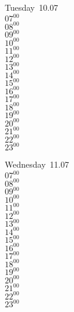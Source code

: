 \documentclass[11pt, a4paper]{book}\usepackage[]{graphicx}\usepackage[]{color}
\begin{document}
\begin{weekdaybox}
  Tuesday~10.07\\
  { 
  \vfill
  $07^{00}$\\
$08^{00}$\\
$09^{00}$\\
$10^{00}$\\
$11^{00}$\\
$12^{00}$\\
$13^{00}$\\
$14^{00}$\\
$15^{00}$\\
$16^{00}$\\
$17^{00}$\\
$18^{00}$\\
$19^{00}$\\
$20^{00}$\\
$21^{00}$\\
$22^{00}$\\
$23^{00}$\\
  }
\end{weekdaybox}
\begin{weekdaybox}
  Wednesday~11.07\\
  { 
  \vfill
  $07^{00}$\\
$08^{00}$\\
$09^{00}$\\
$10^{00}$\\
$11^{00}$\\
$12^{00}$\\
$13^{00}$\\
$14^{00}$\\
$15^{00}$\\
$16^{00}$\\
$17^{00}$\\
$18^{00}$\\
$19^{00}$\\
$20^{00}$\\
$21^{00}$\\
$22^{00}$\\
$23^{00}$\\
  }
\end{weekdaybox}
\clearpage
\begin{headerbox}
\end{headerbox}
\end{document}
